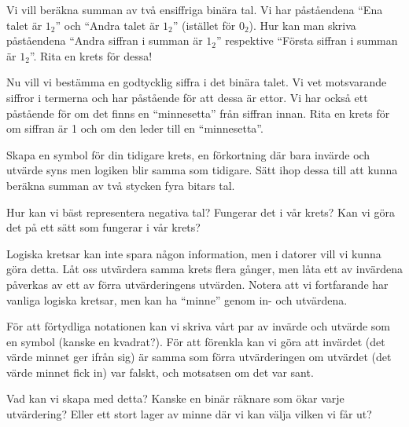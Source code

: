 \begin{problem}
	Vi vill beräkna summan av två ensiffriga binära tal. Vi har påståendena ``Ena talet är \(1_2\)'' och ``Andra talet är \(1_2\)'' (istället för \(0_2\)). Hur kan man skriva påståendena ``Andra siffran i summan är \(1_2\)'' respektive ``Första siffran i summan är \(1_2\)''. Rita en krets för dessa!
\end{problem}

\begin{problem}
	Nu vill vi bestämma en godtycklig siffra i det binära talet. Vi vet motsvarande siffror i termerna och har påstående för att dessa är ettor. Vi har också ett påstående för om det finns en ``minnesetta'' från siffran innan. Rita en krets för om siffran är 1 och om den leder till en ``minnesetta''.
\end{problem}

\begin{problem}
	Skapa en symbol för din tidigare krets, en förkortning där bara invärde och utvärde syns men logiken blir samma som tidigare. Sätt ihop dessa till att kunna beräkna summan av två stycken fyra bitars tal.
\end{problem}

\begin{problem}[Extra]
	Hur kan vi bäst representera negativa tal? Fungerar det i vår krets? Kan vi göra det på ett sätt som fungerar i vår krets?
\end{problem}

\begin{problem}[Extra]
	Logiska kretsar kan inte spara någon information, men i datorer vill vi kunna göra detta. Låt oss utvärdera samma krets flera gånger, men låta ett av invärdena påverkas av ett av förra utvärderingens utvärden. Notera att vi fortfarande har vanliga logiska kretsar, men kan ha ``minne'' genom in- och utvärdena. 

	För att förtydliga notationen kan vi skriva vårt par av invärde och utvärde som en symbol (kanske en kvadrat?). För att förenkla kan vi göra att invärdet (det värde minnet ger ifrån sig) är samma som förra utvärderingen om utvärdet (det värde minnet fick in) var falskt, och motsatsen om det var sant.

	Vad kan vi skapa med detta? Kanske en binär räknare som ökar varje utvärdering? Eller ett stort lager av minne där vi kan välja vilken vi får ut?
\end{problem}


% 
